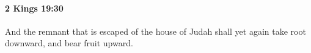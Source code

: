 
		\paragraph{2 Kings 19:30} %
			\label{2KINGS-19-30}

			And the remnant that is escaped of the house of Judah shall yet again take root downward, and bear fruit upward.


